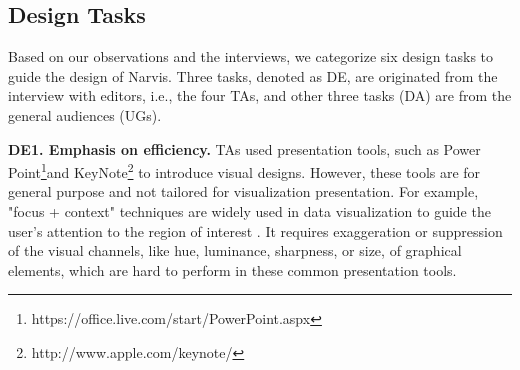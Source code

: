 \subsection{Design Tasks}
Based on our observations and the interviews, we categorize six design tasks to guide the design of Narvis. Three tasks, denoted as DE, are originated from the interview with editors, i.e., the four TAs, and other three tasks (DA) are from the general audiences (UGs).

\textbf{DE1. Emphasis on  efficiency.}
TAs used presentation tools, such as Power Point\footnote{https://office.live.com/start/PowerPoint.aspx}and KeyNote\footnote{http://www.apple.com/keynote/} to introduce visual designs. However, these tools are for general purpose and not tailored for visualization presentation. 
For example, "focus + context" techniques are widely used in data visualization to guide the user’s attention to the region of interest \cite{doleisch2003interactive, kosara2002focus+}. It requires exaggeration or suppression of the visual channels, like hue, luminance, sharpness, or size, of graphical elements, which are hard to perform in these common presentation tools. 

